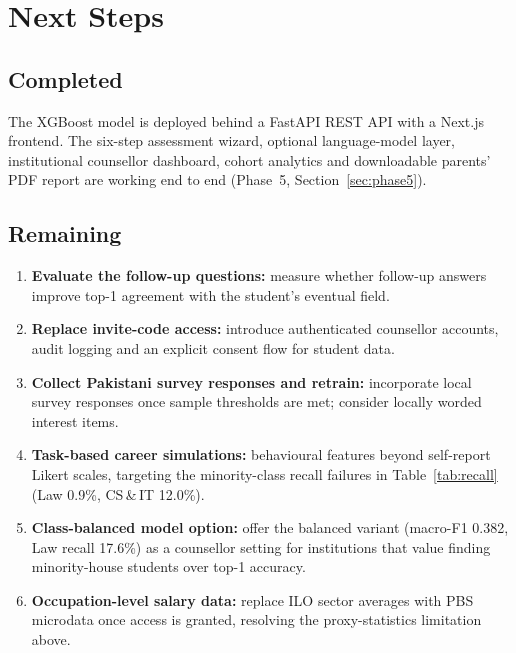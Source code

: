 \documentclass[11pt,a4paper]{article}
\begin{document}
\section{Next Steps}\label{sec:nextsteps}
\subsection*{Completed}
The XGBoost model is deployed behind a FastAPI REST API with a Next.js frontend. The six-step
assessment wizard, optional language-model layer, institutional counsellor dashboard, cohort analytics and downloadable parents'
PDF report are working end to end (Phase~5, Section~\ref{sec:phase5}).

\subsection*{Remaining}
\begin{enumerate}
  \item \textbf{Evaluate the follow-up questions:} measure whether follow-up answers
        improve top-1 agreement with the student's eventual field.
  \item \textbf{Replace invite-code access:} introduce authenticated counsellor accounts,
        audit logging and an explicit consent flow for student data.
  \item \textbf{Collect Pakistani survey responses and retrain:} incorporate local survey
        responses once sample thresholds are met; consider locally worded interest items.
  \item \textbf{Task-based career simulations:} behavioural features beyond self-report
        Likert scales, targeting the minority-class recall failures in Table~\ref{tab:recall}
        (Law 0.9\%, CS\,\&\,IT 12.0\%).
  \item \textbf{Class-balanced model option:} offer the balanced variant (macro-F1 0.382,
        Law recall 17.6\%) as a counsellor setting for institutions that value finding
        minority-house students over top-1 accuracy.
  \item \textbf{Occupation-level salary data:} replace ILO sector averages with PBS microdata
        once access is granted, resolving the proxy-statistics limitation above.
\end{enumerate}
\end{document}
